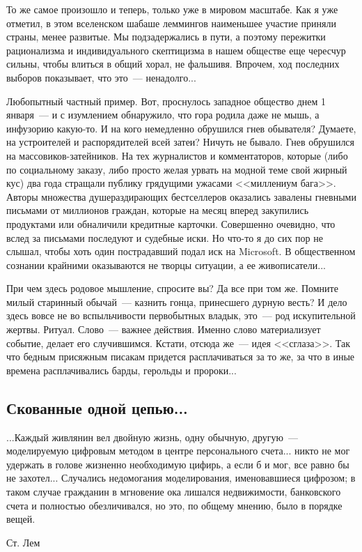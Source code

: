 \documentclass{scrbook}
\makeatletter
\newcommand{\bigepigraphwidth}{0.8} %
\newcommand{\defaultepigraphwidth}{0.5} %
\newcommand{\flqq}{<<}
\newcommand{\frqq}{>>}
\newcommand{\mdash}{~--- }
\newcommand{\essaysection}[1]{\subsection*{#1}\nopagebreak}
\newcommand{\myepigraph}[3][\@empty]{
	\ifx\@empty#1
		\setlength{\epigraphwidth}{\defaultepigraphwidth\textwidth}
	\else
		\setlength{\epigraphwidth}{#1\textwidth}
	\fi
	\epigraph{#2}{#3}
	\setlength{\epigraphwidth}{\defaultepigraphwidth\textwidth} %
	\nopagebreak
}
\makeatother
\begin{document}
То же самое произошло и теперь, только уже в мировом масштабе. Как я уже отметил, в этом вселенском шабаше леммингов наименьшее участие приняли страны, менее развитые. Мы подзадержались в пути, а поэтому пережитки рационализма и индивидуального скептицизма в нашем обществе еще чересчур сильны, чтобы влиться в общий хорал, не фальшивя. Впрочем, ход последних выборов показывает, что это{\mdash}ненадолго...

Любопытный частный пример. Вот, проснулось западное общество днем 1 января{\mdash}и с изумлением обнаружило, что гора родила даже не мышь, а инфузорию какую-то. И на кого немедленно обрушился гнев обывателя? Думаете, на устроителей и распорядителей всей затеи? Ничуть не бывало. Гнев обрушился на массовиков-затейников. На тех журналистов и комментаторов, которые (либо по социальному заказу, либо просто желая урвать на модной теме свой жирный кус) два года стращали публику грядущими ужасами {\flqq}миллениум бага{\frqq}. Авторы множества душераздирающих бестселлеров оказались завалены гневными письмами от миллионов граждан, которые на месяц вперед закупились продуктами или обналичили кредитные карточки. Совершенно очевидно, что вслед за письмами последуют и судебные иски. Но что-то я до сих пор не слышал, чтобы хоть один пострадавший подал иск на Microsoft. В общественном сознании крайними оказываются не творцы ситуации, а ее живописатели...

При чем здесь родовое мышление, спросите вы? Да все при том же. Помните милый старинный обычай{\mdash}казнить гонца, принесшего дурную весть? И дело здесь вовсе не во вспыльчивости первобытных владык, это{\mdash}род искупительной жертвы. Ритуал. Слово{\mdash}важнее действия. Именно слово материализует событие, делает его случившимся. Кстати, отсюда же{\mdash}идея {\flqq}сглаза{\frqq}. Так что бедным присяжным писакам придется расплачиваться за то же, за что в иные времена расплачивались барды, герольды и пророки...

\essaysection{Скованные одной цепью...}

\myepigraph[\bigepigraphwidth]{...Каждый живлянин вел двойную жизнь, одну обычную, другую{\mdash}моделируемую цифровым методом в центре персонального счета... никто не мог удержать в голове жизненно необходимую цифирь, а если б и мог, все равно бы не захотел... Случались недомогания моделирования, именовавшиеся цифрозом; в таком случае гражданин в мгновение ока лишался недвижимости, банковского счета и полностью обезличивался, но это, по общему мнению, было в порядке вещей.}
{Ст. Лем}
\end{document}
